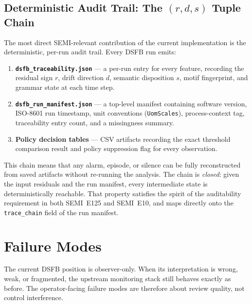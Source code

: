 \documentclass[11pt,letterpaper]{article}
\theoremstyle{scresult}
\begin{document}
\subsection{Deterministic Audit Trail: The $(r,d,s)$ Tuple Chain}

The most direct SEMI-relevant contribution of the current implementation is the
deterministic, per-run audit trail.  Every DSFB run emits:

\begin{enumerate}
  \item \textbf{\texttt{dsfb\_traceability.json}} --- a per-run entry for
        every feature, recording the residual sign $r$, drift direction $d$,
        semantic disposition $s$, motif fingerprint, and grammar state at each
        time step.
  \item \textbf{\texttt{dsfb\_run\_manifest.json}} --- a top-level manifest
        containing software version, ISO-8601 run timestamp, unit conventions
        (\texttt{UomScales}), process-context tag, traceability entry count,
        and a missingness summary.
  \item \textbf{Policy decision tables} --- CSV artifacts recording the exact
        threshold comparison result and policy suppression flag for every
        observation.
\end{enumerate}

This chain means that any alarm, episode, or silence can be fully reconstructed
from saved artifacts without re-running the analysis.  The chain is
\emph{closed}: given the input residuals and the run manifest, every
intermediate state is deterministically reachable.  That property satisfies the
spirit of the auditability requirement in both SEMI~E125 and SEMI~E10, and
maps directly onto the \texttt{trace\_chain} field of the run manifest.

\section{Failure Modes}
\label{sec:failure-modes}

The current DSFB position is observer-only. When its interpretation is wrong,
weak, or fragmented, the upstream monitoring stack still behaves exactly as
before. The operator-facing failure modes are therefore about review quality,
not control interference.
\end{document}
